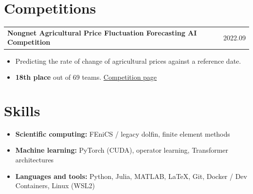 \documentclass[11pt,a4paper]{article}
\makeatletter
\newcommand{\entry}[2]{\noindent\begin{tabularx}{\textwidth}{@{}Xr@{}}#1 & #2\end{tabularx}\par}
\makeatother
\begin{document}
\section{Competitions}

\entry{\textbf{Nongnet Agricultural Price Fluctuation Forecasting AI Competition}}{2022.09}
\begin{itemize}[nosep]
  \item Predicting the rate of change of agricultural prices against a reference date.
  \item \textbf{18th place} out of 69 teams.
    \href{https://aifactory.space/task/2104/overview}{Competition page}
\end{itemize}

\section{Skills}

\begin{itemize}
  \item \textbf{Scientific computing:} FEniCS / legacy dolfin, finite element methods
  \item \textbf{Machine learning:} PyTorch (CUDA), operator learning, Transformer architectures
  \item \textbf{Languages and tools:} Python, Julia, MATLAB, \LaTeX, Git, Docker / Dev Containers, Linux (WSL2)
\end{itemize}
\end{document}
